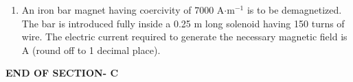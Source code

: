 \documentclass[journal,12pt,onecolumn]{IEEEtran}
\begin{document}
\begin{enumerate}[label=\arabic*)]
\vspace{0.5cm}

\item An iron bar magnet having coercivity of 7000 A$\cdot$m$^{-1}$ is to be demagnetized. The bar is introduced fully inside a 0.25 m long solenoid having 150 turns of wire. The electric current required to generate the necessary magnetic field is \underline{\hspace{2cm}} A (round off to 1 decimal place).
\hfill{} \\

\vspace{0.2cm}

\end{enumerate}

\begin{center}
    \item[\textbf{END OF SECTION- C}]
\end{center}


\newpage
\end{document}
